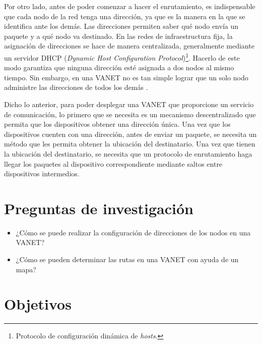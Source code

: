 Por otro lado, antes de poder comenzar a hacer el enrutamiento, es
indispensable que cada nodo de la red tenga una dirección, ya que es la manera
en la que se identifica ante los demás. Las direcciones permiten saber qué nodo
envía un paquete y a qué nodo va destinado. En las redes de infraestructura
fija, la asignación de direcciones se hace de manera centralizada, generalmente
mediante un servidor DHCP (\textit{Dynamic Host Configuration
Protocol})\footnote{Protocolo de configuración dinámica de \textit{hosts}.}.
Hacerlo de este modo garantiza que ninguna dirección esté asignada a dos nodos
al mismo tiempo. Sin embargo, en una VANET no es tan simple lograr que un solo
nodo administre las direcciones de todos los demás \cite{Korichi2018}.

Dicho lo anterior, para poder desplegar una VANET que proporcione un servicio de
comunicación, lo primero que se necesita es un mecanismo descentralizado que
permita que los dispositivos obtener una dirección única. Una vez que los
dispositivos cuenten con una dirección, antes de enviar un paquete, se necesita
un método que les permita obtener la ubicación del destinatario. Una vez que
tienen la ubicación del destinatario, se necesita que un protocolo de
enrutamiento haga llegar los paquetes al dispositivo correspondiente mediante
saltos entre dispositivos intermedios.


\section{Preguntas de investigación}

\label{sec:preguntas_de_investigacion}

\begin{itemize}
  \item ¿Cómo se puede realizar la configuración de direcciones de los nodos en
  una VANET?
  \item ¿Cómo se pueden determinar las rutas en una VANET con ayuda de un mapa?
\end{itemize}


\section{Objetivos}

